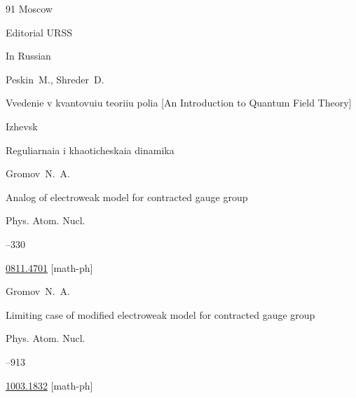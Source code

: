 \begin{thebibliography}{91}
\publaddr Moscow

\publ Editorial URSS










\lang In Russian

\by Peskin~M., Shreder~D. 

\book Vvedenie v kvantovuiu teoriiu polia \rm [An Introduction to Quantum Field Theory]

\publaddr Izhevsk

\publ Reguliarnaia i khaoticheskaia dinamika







\by Gromov~N.~A.

\paper Analog of electroweak model for contracted gauge group

\jour Phys. Atom. Nucl.




--330

\arxiv \href{http://arxiv.org/abs/0811.4701}{0811.4701} [math-ph] 










\by Gromov~N.~A.

\paper  Limiting case of modified electroweak model for contracted gauge group 

\jour Phys. Atom. Nucl.




--913


\arxiv \href{http://arxiv.org/abs/1003.1832}{1003.1832} [math-ph] 


\end{thebibliography}
